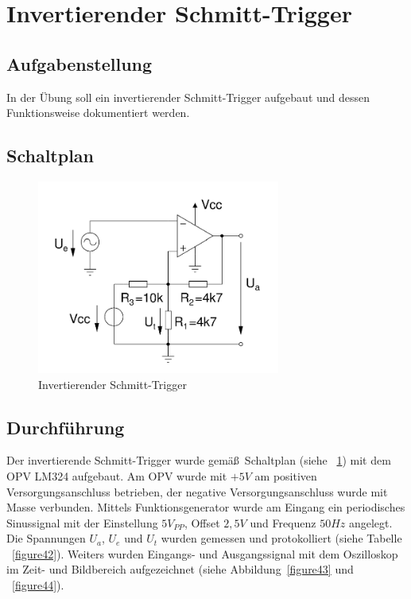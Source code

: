 \documentclass[12pt,a4paper,titlepage]{article}
\begin{document}
\section{Invertierender Schmitt-Trigger}


\subsection*{Aufgabenstellung}
In der \"Ubung soll ein invertierender Schmitt-Trigger aufgebaut und dessen Funktionsweise dokumentiert werden.

\subsection*{Schaltplan}
\begin{figure}[H]
  \centering
  \includegraphics[width=80mm]{i_schmitt_trigger_schaltung.png}
  \caption{Invertierender Schmitt-Trigger}
  \label{figure41}
\end{figure}


\subsection*{Durchf\"uhrung}
Der invertierende Schmitt-Trigger wurde gem\"a\ss \, Schaltplan (siehe ~\ref{figure41}) mit dem OPV LM324 aufgebaut. Am OPV wurde mit $+5V$ am positiven Versorgungsanschluss betrieben, der negative Versorgungsanschluss wurde mit Masse verbunden. Mittels Funktionsgenerator wurde am Eingang ein periodisches Sinussignal mit der Einstellung $5 V_{PP}$, Offset $2,5V$ und Frequenz $50Hz$ angelegt. Die Spannungen $U_a$, $U_e$ und $U_t$ wurden gemessen und protokolliert (siehe Tabelle ~\ref{figure42}). Weiters wurden Eingangs- und Ausgangssignal mit dem Oszilloskop im Zeit- und Bildbereich aufgezeichnet (siehe Abbildung~\ref{figure43} und ~\ref{figure44}).
\end{document}
